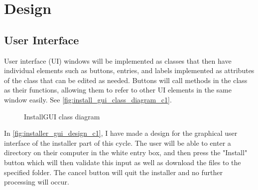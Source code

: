 \section{Design}

    \subsection{User Interface}
        User interface (UI) windows will be implemented as classes that then have individual elements such as buttons, entries, and labels implemented as attributes of the class that can be edited as needed. 
        Buttons will call methods in the class as their functions, allowing them to refer to other UI elements in the same window easily. See \autoref{fig:install_gui_class_diagram_c1}.

        \begin{figure}[!ht]
            \centering
            \caption{InstallGUI class diagram}
            \label{fig:install_gui_class_diagram_c1}
        \end{figure}

        In \autoref{fig:installer_gui_design_c1}, I have made a design for the graphical user interface of the installer part of this cycle. 
        The user will be able to enter a directory on their computer in the white entry box, and then press the "Install" button which will then validate this input as well as download the files to the specified folder. 
        The cancel button will quit the installer and no further processing will occur.

